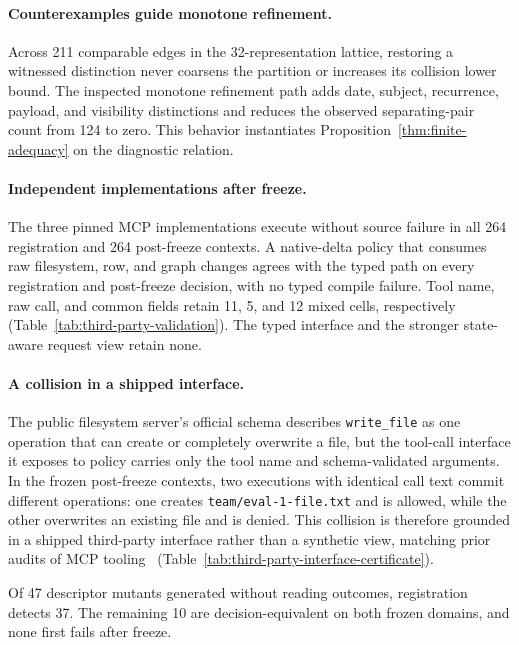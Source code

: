 \paragraph{Counterexamples guide monotone refinement.}
Across 211 comparable edges in the
32-representation lattice, restoring a witnessed distinction never coarsens
the partition or increases its collision lower bound. The inspected monotone refinement path adds
date, subject, recurrence, payload, and visibility distinctions and reduces the
observed separating-pair count from 124 to zero. This behavior instantiates
Proposition~\ref{thm:finite-adequacy} on the diagnostic relation.

\paragraph{Independent implementations after freeze.}

The three pinned MCP implementations execute without source failure in all 264
registration and 264 post-freeze contexts. A native-delta policy that consumes
raw filesystem, row, and graph changes agrees with the typed path on every
registration and post-freeze decision, with no typed compile failure.
Tool name, raw call, and common fields retain 11, 5, and 12 mixed cells,
respectively (Table~\ref{tab:third-party-validation}). The typed interface and
the stronger state-aware request view retain none.

\paragraph{A collision in a shipped interface.}

The public filesystem server's official schema describes \texttt{write\_file}
as one operation that can create or completely overwrite a file, but the
tool-call interface it exposes to policy carries only the tool name and
schema-validated arguments. In the frozen post-freeze contexts, two executions
with identical call text commit different operations: one creates
\texttt{team/eval-1-file.txt} and is allowed, while the other overwrites an
existing file and is denied. This collision is therefore grounded in a shipped
third-party interface rather than a synthetic view, matching prior
audits of MCP tooling~\cite{radosevich2025mcpaudit}
(Table~\ref{tab:third-party-interface-certificate}).

Of 47 descriptor mutants
generated without reading outcomes, registration detects 37. The remaining 10
are decision-equivalent on both frozen domains, and none first fails after
freeze.

